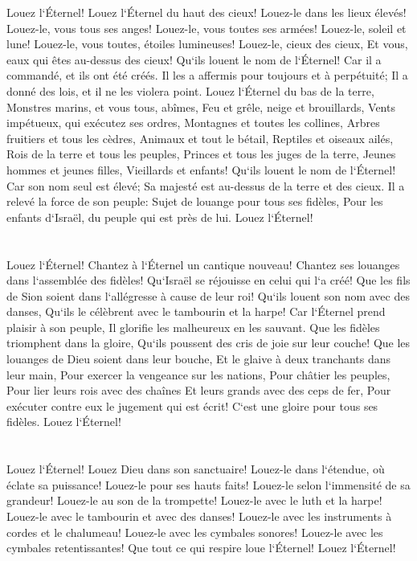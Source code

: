 \verse Louez l`Éternel! Louez l`Éternel du haut des cieux! Louez-le dans les lieux élevés! 
\verse Louez-le, vous tous ses anges! Louez-le, vous toutes ses armées! 
\verse Louez-le, soleil et lune! Louez-le, vous toutes, étoiles lumineuses! 
\verse Louez-le, cieux des cieux, Et vous, eaux qui êtes au-dessus des cieux! 
\verse Qu`ils louent le nom de l`Éternel! Car il a commandé, et ils ont été créés. 
\verse Il les a affermis pour toujours et à perpétuité; Il a donné des lois, et il ne les violera point. 
\verse Louez l`Éternel du bas de la terre, Monstres marins, et vous tous, abîmes, 
\verse Feu et grêle, neige et brouillards, Vents impétueux, qui exécutez ses ordres, 
\verse Montagnes et toutes les collines, Arbres fruitiers et tous les cèdres, 
\verse Animaux et tout le bétail, Reptiles et oiseaux ailés, 
\verse Rois de la terre et tous les peuples, Princes et tous les juges de la terre, 
\verse Jeunes hommes et jeunes filles, Vieillards et enfants! 
\verse Qu`ils louent le nom de l`Éternel! Car son nom seul est élevé; Sa majesté est au-dessus de la terre et des cieux. 
\verse Il a relevé la force de son peuple: Sujet de louange pour tous ses fidèles, Pour les enfants d`Israël, du peuple qui est près de lui. Louez l`Éternel! 

\chapter{}

\verse Louez l`Éternel! Chantez à l`Éternel un cantique nouveau! Chantez ses louanges dans l`assemblée des fidèles! 
\verse Qu`Israël se réjouisse en celui qui l`a créé! Que les fils de Sion soient dans l`allégresse à cause de leur roi! 
\verse Qu`ils louent son nom avec des danses, Qu`ils le célèbrent avec le tambourin et la harpe! 
\verse Car l`Éternel prend plaisir à son peuple, Il glorifie les malheureux en les sauvant. 
\verse Que les fidèles triomphent dans la gloire, Qu`ils poussent des cris de joie sur leur couche! 
\verse Que les louanges de Dieu soient dans leur bouche, Et le glaive à deux tranchants dans leur main, 
\verse Pour exercer la vengeance sur les nations, Pour châtier les peuples, 
\verse Pour lier leurs rois avec des chaînes Et leurs grands avec des ceps de fer, 
\verse Pour exécuter contre eux le jugement qui est écrit! C`est une gloire pour tous ses fidèles. Louez l`Éternel! 

\chapter{}

\verse Louez l`Éternel! Louez Dieu dans son sanctuaire! Louez-le dans l`étendue, où éclate sa puissance! 
\verse Louez-le pour ses hauts faits! Louez-le selon l`immensité de sa grandeur! 
\verse Louez-le au son de la trompette! Louez-le avec le luth et la harpe! 
\verse Louez-le avec le tambourin et avec des danses! Louez-le avec les instruments à cordes et le chalumeau! 
\verse Louez-le avec les cymbales sonores! Louez-le avec les cymbales retentissantes! 
\verse Que tout ce qui respire loue l`Éternel! Louez l`Éternel! 
